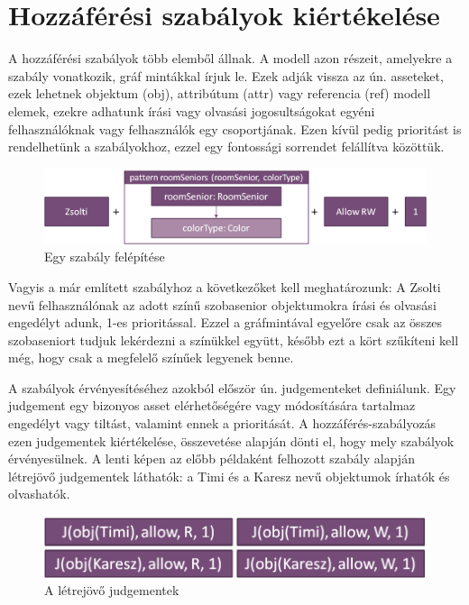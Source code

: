 \chapter{Hozzáférési szabályok kiértékelése}
A hozzáférési szabályok több elemből állnak. A modell azon részeit, amelyekre a szabály vonatkozik, gráf mintákkal írjuk le. Ezek adják vissza az ún. asseteket, ezek lehetnek objektum (obj), attribútum (attr) vagy referencia (ref) modell elemek, ezekre adhatunk írási vagy olvasási jogosultságokat egyéni felhasználóknak vagy felhasználók egy csoportjának. Ezen kívül pedig prioritást is rendelhetünk a szabályokhoz, ezzel egy fontossági sorrendet felállítva közöttük.

\begin{figure}[H]
	\centering
	\includegraphics[width=150mm, keepaspectratio]{figures/rule.png}
	\caption{Egy szabály felépítése}
	\label{fig:rule}
\end{figure}

Vagyis a már említett szabályhoz a következőket kell meghatározunk: A Zsolti nevű felhasználónak az adott színű szobasenior objektumokra írási és olvasási engedélyt adunk, 1-es prioritással. Ezzel a gráfmintával egyelőre csak az összes szobaseniort tudjuk lekérdezni a színükkel együtt, később ezt a kört szűkíteni kell még, hogy csak a megfelelő színűek legyenek benne.

A szabályok érvényesítéséhez azokból először ún. judgementeket definiálunk. Egy judgement egy bizonyos asset elérhetőségére vagy módosítására tartalmaz engedélyt vagy tiltást, valamint ennek a prioritását. A hozzáférés-szabályozás ezen judgementek kiértékelése, összevetése alapján dönti el, hogy mely szabályok érvényesülnek. A lenti képen az előbb példaként felhozott szabály alapján létrejövő judgementek láthatók: a Timi és a Karesz nevű objektumok írhatók és olvashatók.

\begin{figure}[H]
	\centering
	\includegraphics[width=150mm, keepaspectratio]{figures/judgement.png}
	\caption{A létrejövő judgementek}
	\label{fig:judgement}
\end{figure}

